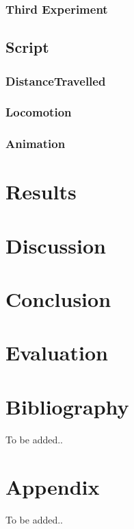 \documentclass[12pt]{report}
\begin{document}
\subsection{Third Experiment}
\section{Script}
\subsection{DistanceTravelled}
\subsection{Locomotion}
\subsection{Animation}


\chapter{Results}
\chapter{Discussion}
\chapter{Conclusion}
\chapter{Evaluation} 




\renewcommand\bibname{References}




\chapter*{Bibliography}
To be added..

\chapter*{Appendix}
To be added..
\end{document}

